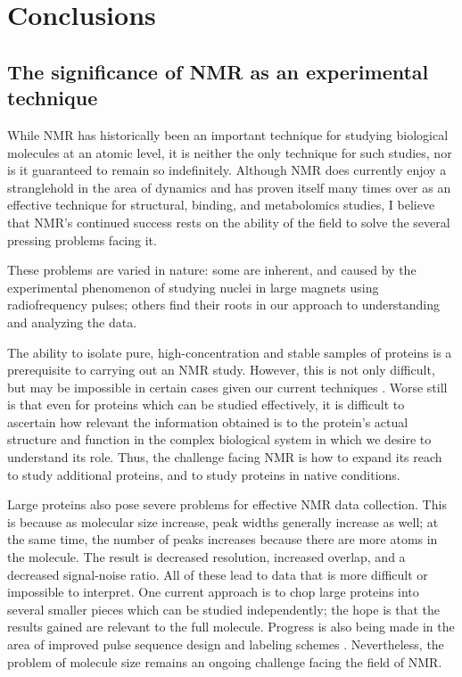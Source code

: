 \chapter{Conclusions}

\section{The significance of NMR as an experimental technique}
While NMR has historically been an important technique for studying biological
molecules at an atomic level, it is neither the only technique for such 
studies, nor is it guaranteed to remain so indefinitely.  Although NMR does
currently enjoy a stranglehold in the area of dynamics and has proven itself
many times over as an effective technique for structural, binding, and metabolomics
studies, I believe that NMR's continued success rests on the ability of the
field to solve the several pressing problems facing it.

These problems are varied in nature: some are inherent, and caused by the 
experimental phenomenon of studying nuclei in large magnets using 
radiofrequency pulses; others find their roots in our approach to 
understanding and analyzing the data.

The ability to isolate pure, high-concentration and stable samples of proteins 
is a prerequisite to carrying out an NMR study.  However, this is not only
difficult, but may be impossible in certain cases given our current techniques
\cite{bellstedt2013resonance}.  Worse still is that even for proteins which
can be studied effectively, it is difficult to ascertain how relevant the 
information obtained is to the protein's actual structure and function in the
complex biological system in which we desire to understand its role.  Thus, 
the challenge facing NMR is how to expand its reach to study additional proteins,
and to study proteins in native conditions.

Large proteins also pose severe problems for effective NMR data collection.  
This is because as molecular size increase, peak widths generally increase as
well; at the same time, the number of peaks increases because there are more
atoms in the molecule.  The result is decreased resolution, increased overlap,
and a decreased signal-noise ratio.  All of these lead to data that is more
difficult or impossible to interpret.  One current approach is to chop large
proteins into several smaller pieces which can be studied independently; the
hope is that the results gained are relevant to the full molecule.  
Progress is also being made in the area of improved pulse sequence design
and labeling schemes \cite{tzeng2012nmr}.  Nevertheless, the problem of molecule
size remains an ongoing challenge facing the field of NMR.

